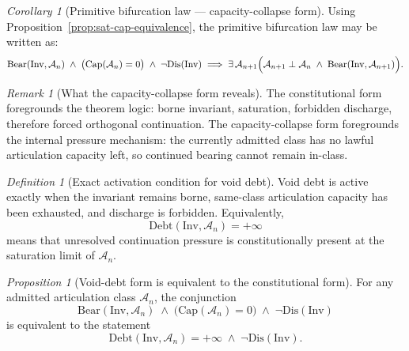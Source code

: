 \documentclass[11pt]{article}
\theoremstyle{definition}
\theoremstyle{plain}
\theoremstyle{remark}
\newtheorem{proposition}{Proposition}
\newtheorem{corollary}{Corollary}
\newtheorem{definition}{Definition}
\newtheorem{remark}{Remark}
\newcommand{\Inv}{\mathrm{Inv}}
\newcommand{\Bear}{\mathrm{Bear}}
\newcommand{\Dis}{\mathrm{Dis}}
\newcommand{\Debt}{\mathrm{Debt}}
\newcommand{\ArtCap}{\mathrm{Cap}}
\newcommand{\Aclass}{\mathcal{A}}
\begin{document}
\begin{corollary}[Primitive bifurcation law --- capacity-collapse form]
\label{cor:capacity-form}
Using Proposition~\ref{prop:sat-cap-equivalence}, the primitive bifurcation law may be written as:
\begin{equation}
\label{eq:capacity-form}
\Bear(\Inv,\Aclass_n)
\;\wedge\;
\bigl(\ArtCap(\Aclass_n)=0\bigr)
\;\wedge\;
\neg\Dis(\Inv)
\;\Longrightarrow\;
\exists \, \Aclass_{n+1}
\Bigl(
\Aclass_{n+1}\perp \Aclass_n
\;\wedge\;
\Bear(\Inv,\Aclass_{n+1})
\Bigr).
\end{equation}
\end{corollary}

\begin{remark}[What the capacity-collapse form reveals]
The constitutional form foregrounds the theorem logic: borne invariant, saturation, forbidden discharge, therefore forced orthogonal continuation. The capacity-collapse form foregrounds the internal pressure mechanism: the currently admitted class has no lawful articulation capacity left, so continued bearing cannot remain in-class.
\end{remark}

\begin{definition}[Exact activation condition for void debt]
\label{def:debt-activation}
Void debt is active exactly when the invariant remains borne, same-class articulation capacity has been exhausted, and discharge is forbidden. Equivalently,
\begin{equation}
\label{eq:debt-activation}
\Debt(\Inv,\Aclass_n)=+\infty
\end{equation}
means that unresolved continuation pressure is constitutionally present at the saturation limit of $\Aclass_n$.
\end{definition}

\begin{proposition}[Void-debt form is equivalent to the constitutional form]
\label{prop:debt-equivalence}
For any admitted articulation class $\Aclass_n$, the conjunction
\begin{equation}
\label{eq:debt-equivalence-left}
\Bear(\Inv,\Aclass_n)
\;\wedge\;
\bigl(\ArtCap(\Aclass_n)=0\bigr)
\;\wedge\;
\neg\Dis(\Inv)
\end{equation}
is equivalent to the statement
\begin{equation}
\label{eq:debt-equivalence-right}
\Debt(\Inv,\Aclass_n)=+\infty
\;\wedge\;
\neg\Dis(\Inv).
\end{equation}
\end{proposition}
\end{document}
